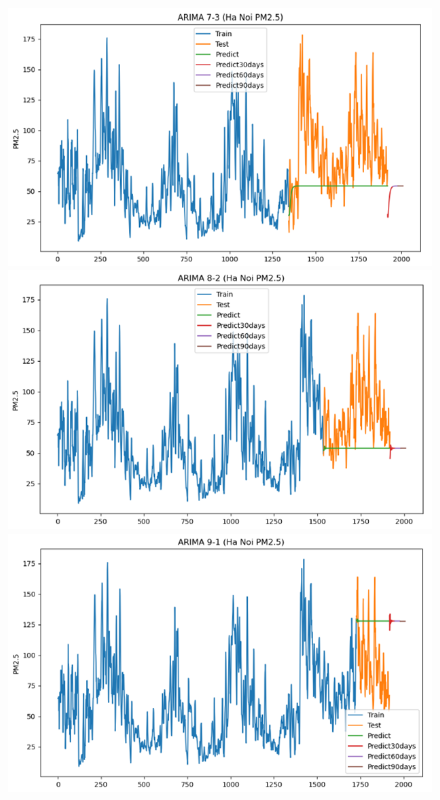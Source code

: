 \begin{figure}[H]
{\begin{adjustbox}{minipage=0.48\textwidth}
\begin{minipage}{0.3\textwidth}
            \end{minipage}\hfill
            \begin{minipage}{0.3\textwidth}
                \centering
                \includegraphics[width=\textwidth, height=0.5\textwidth]{img/final/ARIMA/90D/ARIMA_7_3_HN.png}\\
                \includegraphics[width=\textwidth, height=0.5\textwidth]{img/final/ARIMA/90D/ARIMA_8_2_HN.png}\\
                \includegraphics[width=\textwidth, height=0.5\textwidth]{img/final/ARIMA/90D/ARIMA_9_1_HN.png}
            \end{minipage}\hfill

\end{adjustbox}}
\end{figure}

